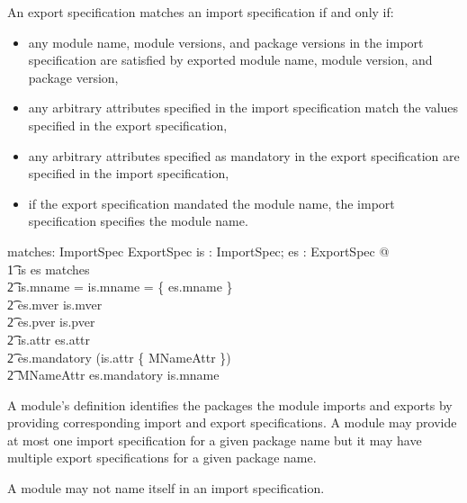 \documentclass[a4paper,9pt]{article}
\begin{document}
An export specification matches an import specification if and only if:
\begin{itemize}
\item any module
 name, module versions, and package versions in the import specification are
satisfied by exported module  name, module version, and package version,
\item any arbitrary attributes specified in the import specification match the values specified
in the export specification,
\item any arbitrary attributes specified as mandatory in the export specification are specified
in the import specification,
\item if the export specification mandated the module  name, the import specification
specifies the module  name.
\end{itemize}
\begin{axdef}
  matches: ImportSpec \rel ExportSpec
\where
  \forall is : ImportSpec; es : ExportSpec @ \\
\t1 is \mapsto es \in matches \iff \\
\t2 is.mname = \empty \lor is.mname = \{ es.mname \} \land \\
\t2 es.mver \in is.mver \land \\
\t2 es.pver \in is.pver \land \\
\t2 is.attr \subseteq es.attr \land \\
\t2 es.mandatory \subseteq (\dom is.attr \cup \{ MNameAttr \}) \land \\
\t2 MNameAttr \in es.mandatory \implies  is.mname \neq \empty \\
\end{axdef}

A module's definition identifies the packages the module imports and exports
by providing corresponding import and export specifications.
A module may provide at most
one import specification for a given package name but it may have multiple
export specifications for a given package name.

A module may not name itself in an import specification.
\end{document}
